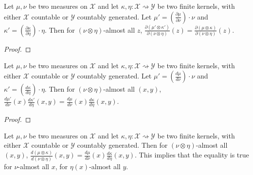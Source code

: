 \begin{lemma}
  \label{lem:rnDeriv_eq_ac}
  \leanok
  Let $\mu, \nu$ be two measures on $\mathcal X$ and let $\kappa, \eta : \mathcal X \rightsquigarrow \mathcal Y$ be two finite kernels, with either $\mathcal X$ countable or $\mathcal{Y}$ countably generated.
  Let $\mu' = \left(\frac{\partial \mu}{\partial \nu}\right) \cdot \nu$ and $\kappa' = \left(\frac{\partial \kappa}{\partial \eta}\right) \cdot \eta$.
  Then for $(\nu \otimes \eta)$-almost all $z$, $\frac{\partial(\mu' \otimes \kappa')}{\partial (\nu \otimes \eta)}(z) = \frac{\partial(\mu \otimes \kappa)}{\partial (\nu \otimes \eta)}(z)$.
\end{lemma}

\begin{proof} \leanok
\end{proof}


\begin{lemma}
  \label{lem:prod_rnDeriv_eq_ac}
  \leanok
  Let $\mu, \nu$ be two measures on $\mathcal X$ and let $\kappa, \eta : \mathcal X \rightsquigarrow \mathcal Y$ be two finite kernels, with either $\mathcal X$ countable or $\mathcal{Y}$ countably generated.
  Let $\mu' = \left(\frac{d \mu}{d \nu}\right) \cdot \nu$ and $\kappa' = \left(\frac{d \kappa}{d \eta}\right) \cdot \eta$. Then for $(\nu \otimes \eta)$-almost all $(x, y)$, $\frac{d\mu'}{d\nu}(x)\frac{d \kappa'}{d \eta}(x,y) = \frac{d\mu}{d\nu}(x)\frac{d \kappa}{d \eta}(x,y)$.
\end{lemma}

\begin{proof} \leanok
\end{proof}


\begin{lemma}
  \label{lem:rnDeriv_compProd}
  \leanok
  Let $\mu, \nu$ be two measures on $\mathcal X$ and let $\kappa, \eta : \mathcal X \rightsquigarrow \mathcal Y$ be two finite kernels, with either $\mathcal X$ countable or $\mathcal{Y}$ countably generated.
  Then for $(\nu \otimes \eta)$-almost all $(x, y)$, $\frac{d (\mu \otimes \kappa)}{d (\nu \otimes \eta)}(x,y) = \frac{d\mu}{d\nu}(x)\frac{d \kappa}{d \eta}(x,y)$.
  This implies that the equality is true for $\nu$-almost all $x$, for $\eta(x)$-almost all $y$.
\end{lemma}

